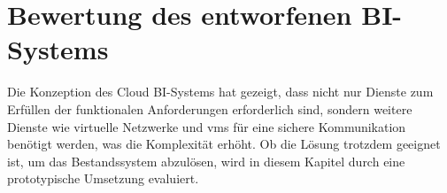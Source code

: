 \chapter{Bewertung des entworfenen BI-Systems} \label{ch:praktischeUmsetzung}
Die Konzeption des Cloud BI-Systems hat gezeigt, dass nicht nur Dienste zum Erfüllen der funktionalen Anforderungen erforderlich sind, sondern weitere Dienste wie virtuelle Netzwerke und \acp{vm} für eine sichere Kommunikation benötigt werden, was die Komplexität erhöht. Ob die Lösung trotzdem geeignet ist, um das Bestandssystem abzulösen, wird in diesem Kapitel durch eine prototypische Umsetzung evaluiert.




